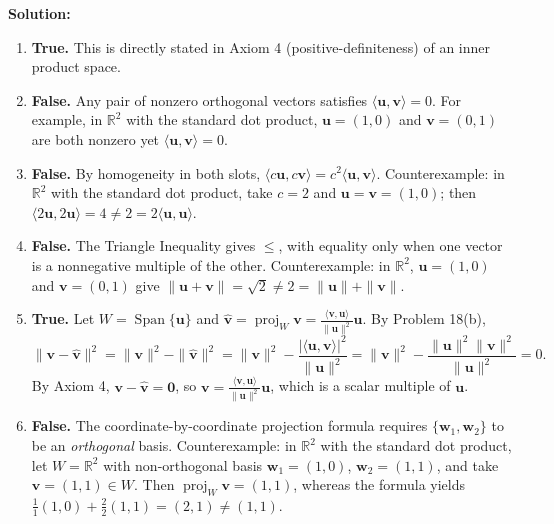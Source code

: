 \documentclass[11pt, letterpaper]{article}
\theoremstyle{definition}
\theoremstyle{remark}
\begin{document}
\textbf{Solution:}
\begin{enumerate}[label=(\alph*)]
    \item \textbf{True.} This is directly stated in Axiom 4 (positive-definiteness) of an inner product space.
    \item \textbf{False.} Any pair of nonzero orthogonal vectors satisfies $\langle \mathbf{u}, \mathbf{v} \rangle = 0$. For example, in $\mathbb{R}^2$ with the standard dot product, $\mathbf{u} = (1, 0)$ and $\mathbf{v} = (0, 1)$ are both nonzero yet $\langle \mathbf{u}, \mathbf{v} \rangle = 0$.
    \item \textbf{False.} By homogeneity in both slots, $\langle c\mathbf{u}, c\mathbf{v} \rangle = c^2\langle \mathbf{u}, \mathbf{v} \rangle$. Counterexample: in $\mathbb{R}^2$ with the standard dot product, take $c = 2$ and $\mathbf{u} = \mathbf{v} = (1, 0)$; then $\langle 2\mathbf{u}, 2\mathbf{u} \rangle = 4 \neq 2 = 2\langle \mathbf{u}, \mathbf{u} \rangle$.
    \item \textbf{False.} The Triangle Inequality gives $\le$, with equality only when one vector is a nonnegative multiple of the other. Counterexample: in $\mathbb{R}^2$, $\mathbf{u} = (1, 0)$ and $\mathbf{v} = (0, 1)$ give $\|\mathbf{u} + \mathbf{v}\| = \sqrt{2} \neq 2 = \|\mathbf{u}\| + \|\mathbf{v}\|$.
    \item \textbf{True.} Let $W = \operatorname{Span}\{\mathbf{u}\}$ and $\hat{\mathbf{v}} = \operatorname{proj}_W \mathbf{v} = \frac{\langle \mathbf{v}, \mathbf{u} \rangle}{\|\mathbf{u}\|^2}\mathbf{u}$. By Problem 18(b),
    \[
    \|\mathbf{v} - \hat{\mathbf{v}}\|^2 = \|\mathbf{v}\|^2 - \|\hat{\mathbf{v}}\|^2 = \|\mathbf{v}\|^2 - \frac{|\langle \mathbf{u}, \mathbf{v} \rangle|^2}{\|\mathbf{u}\|^2} = \|\mathbf{v}\|^2 - \frac{\|\mathbf{u}\|^2\|\mathbf{v}\|^2}{\|\mathbf{u}\|^2} = 0.
    \]
    By Axiom 4, $\mathbf{v} - \hat{\mathbf{v}} = \mathbf{0}$, so $\mathbf{v} = \frac{\langle \mathbf{v}, \mathbf{u} \rangle}{\|\mathbf{u}\|^2}\mathbf{u}$, which is a scalar multiple of $\mathbf{u}$.
    \item \textbf{False.} The coordinate-by-coordinate projection formula requires $\{\mathbf{w}_1, \mathbf{w}_2\}$ to be an \emph{orthogonal} basis. Counterexample: in $\mathbb{R}^2$ with the standard dot product, let $W = \mathbb{R}^2$ with non-orthogonal basis $\mathbf{w}_1 = (1, 0)$, $\mathbf{w}_2 = (1, 1)$, and take $\mathbf{v} = (1, 1) \in W$. Then $\operatorname{proj}_W \mathbf{v} = (1, 1)$, whereas the formula yields $\frac{1}{1}(1, 0) + \frac{2}{2}(1, 1) = (2, 1) \neq (1, 1)$.
\end{enumerate}
\end{document}
